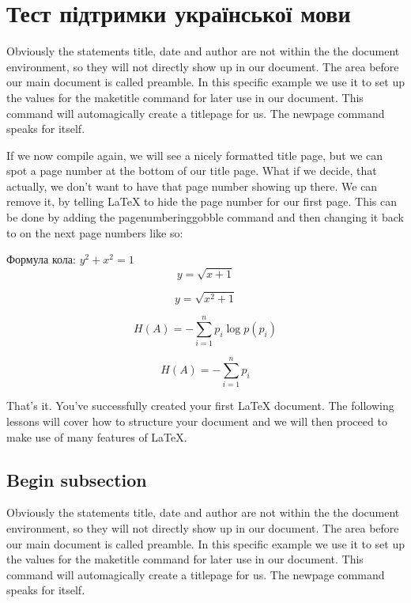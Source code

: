 	
\section{Тест підтримки української мови}
	
Obviously the statements title, date and author are not within the the document environment, so they will not directly show up in our document. The area before our main document is called preamble. In this specific example we use it to set up the values for the maketitle command for later use in our document. This command will automagically create a titlepage for us. The newpage command speaks for itself.

If we now compile again, we will see a nicely formatted title page, but we can spot a page number at the bottom of our title page. What if we decide, that actually, we don’t want to have that page number showing up there. We can remove it, by telling LaTeX to hide the page number for our first page. This can be done by adding the pagenumbering{gobble} command and then changing it back to  on the next page numbers like so:


Формула кола: $ y^2 + x^2 = 1  $
$$
 y = \sqrt{x+1}
$$

\[
y = \sqrt{x^2+1}
\]


\begin{equation}\label{eq1}
	H(A)=-\sum \limits_{i=1}^n p_i \log p(p_i)
\end{equation}

\begin{equation}\label{eq2}
	H(A)=-\sum \limits_{i=1}^n p_i 
\end{equation}

That’s it. You’ve successfully created your first LaTeX document. The following lessons will cover how to structure your document and we will then proceed to make use of many features of LaTeX.

\subsection{Begin subsection}
Obviously the statements title, date and author are not within the the document environment, so they will not directly show up in our document. The area before our main document is called preamble. In this specific example we use it to set up the values for the maketitle command for later use in our document. This command will automagically create a titlepage for us. The newpage command speaks for itself.

